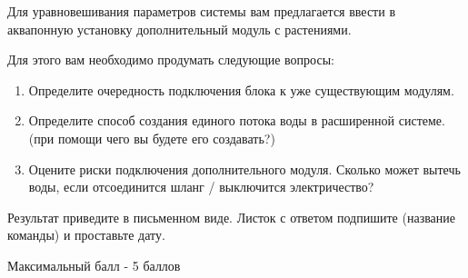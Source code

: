 
Для уравновешивания параметров системы вам предлагается ввести в аквапонную установку дополнительный модуль с растениями. 

Для этого вам необходимо продумать следующие вопросы:
\begin{enumerate}
    \item Определите очередность подключения блока к уже существующим модулям.
    \item Определите способ создания единого потока воды в расширенной системе. (при помощи чего вы будете его создавать?)
    \item Оцените риски подключения дополнительного модуля. Сколько может вытечь воды, если отсоединится шланг / выключится электричество?
\end{enumerate}
  
Результат приведите в письменном виде. Листок с ответом подпишите (название команды) и проставьте дату.


Максимальный балл - 5 баллов

\markSection

